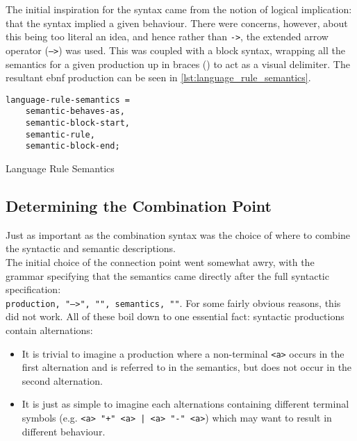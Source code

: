 The initial inspiration for the syntax came from the notion of logical implication: that the syntax implied a given behaviour. 
There were concerns, however, about this being too literal an idea, and hence rather than \texttt{->}, the extended arrow operator (\texttt{-->}) was used. 
This was coupled with a block syntax, wrapping all the semantics for a given production up in braces (\texttt{{}}) to act as a visual delimiter.
The resultant \gls{ebnf} production can be seen in \autoref{lst:language_rule_semantics}. 

\begin{listing}[!htb]
\begin{verbatim}
language-rule-semantics = 
    semantic-behaves-as,
    semantic-block-start,
    semantic-rule,
    semantic-block-end;
\end{verbatim}
\caption{Language Rule Semantics}
\label{lst:language_rule_semantics}
\end{listing}


\subsection{Determining the Combination Point} %
\label{sub:determining_the_combination_point}
Just as important as the combination syntax was the choice of where to combine the syntactic and semantic descriptions.\\

The initial choice of the connection point went somewhat awry, with the grammar specifying that the semantics came directly after the full syntactic specification: \\
\texttt{production, "-->", "{", semantics, "}"}.
For some fairly obvious reasons, this did not work.
All of these boil down to one essential fact: syntactic productions contain alternations:
\begin{itemize}
    \item It is trivial to imagine a production where a non-terminal \texttt{<a>} occurs in the first alternation and is referred to in the semantics, but does not occur in the second alternation. 
    \item It is just as simple to imagine each alternations containing different terminal symbols (e.g. \texttt{<a> "+" <a> | <a> "-" <a>}) which may want to result in different behaviour. 
\end{itemize}

